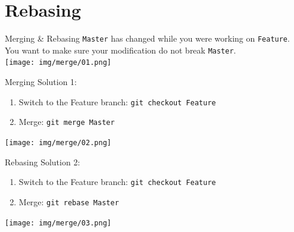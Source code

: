 \documentclass[usenames,dvipsnames,9pt]{beamer}
\begin{document}
%
%
\section{Rebasing}

%
\begin{frame}{Merging \& Rebasing}
  \texttt{Master} has changed while you were working on \texttt{Feature}.\\
  You want to make sure your modification do not break \texttt{Master}.\\
  \vspace{0.37cm}
  \texttt{[image: img/merge/01.png]}
\end{frame}

%
\begin{frame}{Merging}
  Solution 1:
  \begin{enumerate}
    \item Switch to the Feature branch: \lstinline|git checkout Feature|
    \item Merge: \lstinline|git merge Master|
  \end{enumerate}
  \texttt{[image: img/merge/02.png]}
\end{frame}

%
\begin{frame}{Rebasing}
  Solution 2:
  \begin{enumerate}
    \item Switch to the Feature branch: \lstinline|git checkout Feature|
    \item Merge: \lstinline|git rebase Master|
  \end{enumerate}
  \texttt{[image: img/merge/03.png]}
  \vspace{-0.06cm}
\end{frame}
\end{document}
